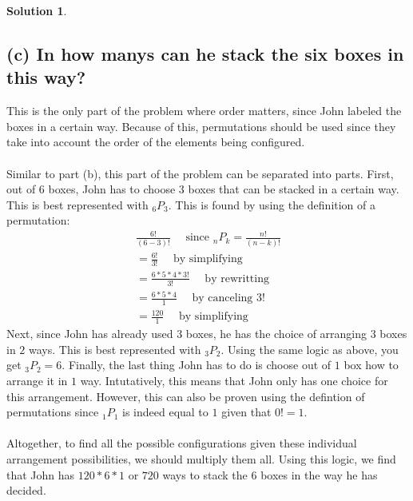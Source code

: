 \documentclass{article}
\theoremstyle{definition}
\newtheorem*{solution}{Solution}
\begin{document}
\begin{solution}
\subsection*{(c) In how manys can he stack the six boxes in this way?}
This is the only part of the problem where order matters, since John labeled the boxes in a certain way. Because of this, permutations should be used since they take into account the order of the elements being configured.\\\\
Similar to part (b), this part of the problem can be separated into parts. First, out of 6 boxes, John has to choose 3 boxes that can be stacked in a certain way. This is best represented with ${}_6 P_3$. This is found by using the definition of a permutation:
\begin{align*}
&\frac{6!}{(6-3)!} \quad \mbox{ since ${}_n P_k = \frac{n!}{(n-k)!}$ }\\
&=\frac{6!}{3!} \quad \mbox{ by simplifying}\\
&=\frac{6*5*4*3!}{3!} \quad \mbox{ by rewritting}\\
&=\frac{6*5*4}{1} \quad \mbox{ by canceling 3!}\\
&=\frac{120}{1} \quad \mbox{ by simplifying}
\end{align*}
Next, since John has already used 3 boxes, he has the choice of arranging $3$ boxes in $2$ ways. This is best represented with ${}_3 P_2$. Using the same logic as above, you get ${}_3 P_2 = 6$. Finally, the last thing John has to do is choose out of $1$ box how to arrange it in $1$ way. Intutatively, this means that John only has one choice for this arrangement. However, this can also be proven using the defintion of permutations since ${}_1 P_1$ is indeed equal to $1$ given that $0! = 1$.\\\\
Altogether, to find all the possible configurations given these individual arrangement possibilities, we should multiply them all. Using this logic, we find that John has $120 * 6 * 1$ or $720$ ways to stack the $6$ boxes in the way he has decided.
\end{solution}
\end{document}
